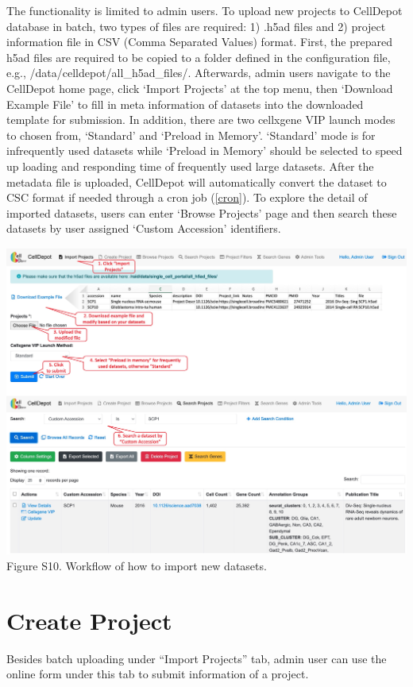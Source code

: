 \documentclass[
  openany]{book}
\begin{document}
The functionality is limited to admin users. To upload new projects to CellDepot database in batch, two types of files are required: 1) .h5ad files and 2) project information file in CSV (Comma Separated Values) format. First, the prepared h5ad files are required to be copied to a folder defined in the configuration file, e.g., /data/celldepot/all\_h5ad\_files/. Afterwards, admin users navigate to the CellDepot home page, click `Import Projects' at the top menu, then `Download Example File' to fill in meta information of datasets into the downloaded template for submission. In addition, there are two cellxgene VIP launch modes to chosen from, `Standard' and `Preload in Memory'. `Standard' mode is for infrequently used datasets while `Preload in Memory' should be selected to speed up loading and responding time of frequently used large datasets.
After the metadata file is uploaded, CellDepot will automatically convert the dataset to CSC format if needed through a cron job (\ref{cron}). To explore the detail of imported datasets, users can enter `Browse Projects' page and then search these datasets by user assigned `Custom Accession' identifiers.

\href{figures/S10.jpg}{\includegraphics{figures/S10.jpg}}
Figure S10. Workflow of how to import new datasets.

\hypertarget{create-project}{%
\section{Create Project}\label{create-project}}

Besides batch uploading under ``Import Projects'' tab, admin user can use the online form under this tab to submit information of a project.
\end{document}
